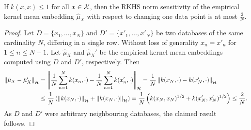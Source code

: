\begin{lemma}
	\label{lem:KME_RKHS_sensitivity}
	If $k(x, x) \leq 1$ for all $x \in \mathcal{X}$, then the RKHS norm sensitivity of the empirical kernel mean embedding $\hat{\mu}_X$ with respect to changing one data point is at most $\frac{2}{N}$.
	\begin{proof}
		Let $D = \{ x_1, \ldots ,x_N \}$ and $D' = \{ x'_1, \ldots, x'_N \}$ be two databases of the same cardinality $N$, differing in a single row. Without loss of generality $x_n = x'_n$ for $1 \leq n \leq N - 1$. Let $\hat{\mu}_X$ and $\hat{\mu}_X'$ be the empirical kernel mean embeddings computed using $D$ and $D'$, respectively. Then
		\begin{align}
		\left\| \hat{\mu}_X - \hat{\mu}_X' \right\|_{\mathcal{H}}
		&=
		\left\| \frac{1}{N} \sum_{n = 1}^N k(x_n, \cdot) - \frac{1}{N} \sum_{n = 1}^N k(x'_n, \cdot) \right\|_{\mathcal{H}}
		=
		\frac{1}{N} \left\| k(x_N, \cdot) - k(x'_N, \cdot) \right\|_{\mathcal{H}}
		\\&\leq
		\frac{1}{N} \left(
		\left\| k(x_N, \cdot) \right\|_{\mathcal{H}} + \left\| k(x_N, \cdot) \right\|_{\mathcal{H}}
		\right)
		=
		\frac{1}{N} \left(
		k(x_N, x_N)^{1/2} + k(x'_N, x'_N)^{1/2}
		\right)
		\leq
		\frac{2}{N}
		.
		\end{align}
		As $D$ and $D'$ were arbitrary neighbouring databases, the claimed result follows.
	\end{proof}
\end{lemma}


